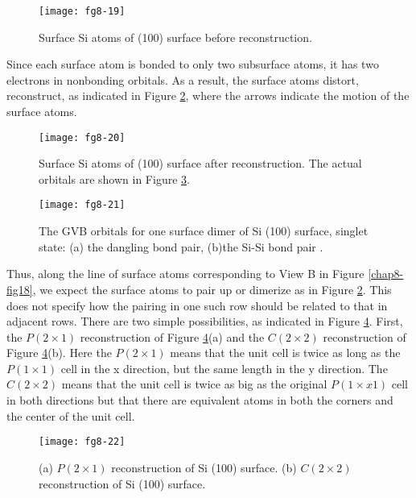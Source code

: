 \begin{figure}
\begin{center}
\texttt{[image: fg8-19]}
\end{center}
\caption{Surface Si atoms of (100) surface before reconstruction.}
\label{chap8-fig19}
\end{figure}

Since each surface atom is bonded to only two subsurface atoms, it has
two electrons in nonbonding orbitals.  As a result, the surface atoms
distort, reconstruct, as indicated in Figure \ref{chap8-fig20}, where
the arrows indicate the motion of the surface atoms.


\begin{figure}
\begin{center}
\texttt{[image: fg8-20]}
\end{center}
\caption{Surface Si atoms of (100) surface after reconstruction. The
actual orbitals are shown in Figure \ref{chap8-fig21}.}
\label{chap8-fig20}
\end{figure}

\begin{figure}
\begin{center}
\texttt{[image: fg8-21]}
\end{center}
\caption{The GVB orbitals for one surface dimer of Si (100) surface,
singlet state: (a) the dangling bond pair, (b)the Si-Si bond pair
\cite{chap8-ref1}.}
\label{chap8-fig21}
\end{figure}

Thus, along the line of surface atoms corresponding to View B in
Figure \ref{chap8-fig18}, we expect the surface atoms to pair up or
dimerize as in Figure \ref{chap8-fig20}. This does not specify how the
pairing in one such row should be related to that in adjacent
rows. There are two simple possibilities, as indicated in Figure
\ref{chap8-fig22}.  First, the $P(2 \times 1)$ reconstruction of
Figure \ref{chap8-fig22}(a) and the $C(2 \times 2)$ reconstruction of
Figure \ref{chap8-fig22}(b).  Here the $P(2 \times 1)$ means that the
unit cell is twice as long as the $P(1 \times 1)$ cell in the x
direction, but the same length in the y direction.  The $C(2 \times
2)$ means that the unit cell is twice as big as the original $P(1
\times x 1)$ cell in both directions but that there are equivalent
atoms in both the corners and the center of the unit cell.

\begin{figure}
\begin{center}
\texttt{[image: fg8-22]}
\end{center}
\caption{(a) $P(2 \times 1)$ reconstruction  of Si (100) surface. (b)
$C(2 \times 2)$ reconstruction of Si (100) surface.} 
\label{chap8-fig22}
\end{figure}


